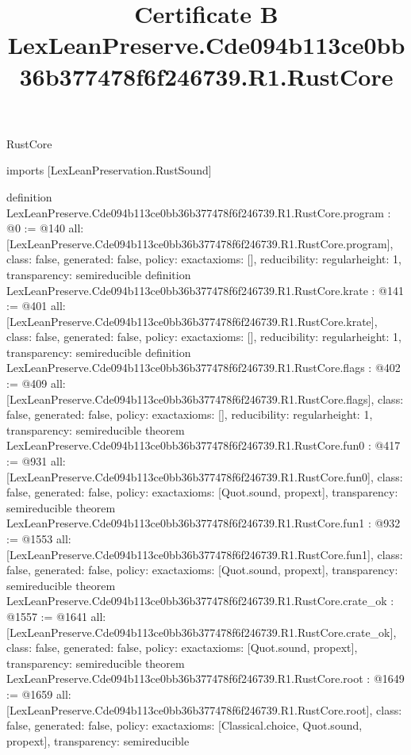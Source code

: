 \begin{lexlean}{RustCore}
\title{Certificate B LexLeanPreserve.Cde094b113ce0bb36b377478f6f246739.R1.RustCore}
\begin{coremodule}
imports [LexLeanPreservation.RustSound]

definition LexLeanPreserve.Cde094b113ce0bb36b377478f6f246739.R1.RustCore.program : @0 := @140 {
  all: [LexLeanPreserve.Cde094b113ce0bb36b377478f6f246739.R1.RustCore.program],
  class: false,
  generated: false,
  policy: exact{axioms: []},
  reducibility: regular{height: 1},
  transparency: semireducible
}
definition LexLeanPreserve.Cde094b113ce0bb36b377478f6f246739.R1.RustCore.krate : @141 := @401 {
  all: [LexLeanPreserve.Cde094b113ce0bb36b377478f6f246739.R1.RustCore.krate],
  class: false,
  generated: false,
  policy: exact{axioms: []},
  reducibility: regular{height: 1},
  transparency: semireducible
}
definition LexLeanPreserve.Cde094b113ce0bb36b377478f6f246739.R1.RustCore.flags : @402 := @409 {
  all: [LexLeanPreserve.Cde094b113ce0bb36b377478f6f246739.R1.RustCore.flags],
  class: false,
  generated: false,
  policy: exact{axioms: []},
  reducibility: regular{height: 1},
  transparency: semireducible
}
theorem LexLeanPreserve.Cde094b113ce0bb36b377478f6f246739.R1.RustCore.fun0 : @417 := @931 {
  all: [LexLeanPreserve.Cde094b113ce0bb36b377478f6f246739.R1.RustCore.fun0],
  class: false,
  generated: false,
  policy: exact{axioms: [Quot.sound, propext]},
  transparency: semireducible
}
theorem LexLeanPreserve.Cde094b113ce0bb36b377478f6f246739.R1.RustCore.fun1 : @932 := @1553 {
  all: [LexLeanPreserve.Cde094b113ce0bb36b377478f6f246739.R1.RustCore.fun1],
  class: false,
  generated: false,
  policy: exact{axioms: [Quot.sound, propext]},
  transparency: semireducible
}
theorem LexLeanPreserve.Cde094b113ce0bb36b377478f6f246739.R1.RustCore.crate_ok : @1557 := @1641 {
  all: [LexLeanPreserve.Cde094b113ce0bb36b377478f6f246739.R1.RustCore.crate_ok],
  class: false,
  generated: false,
  policy: exact{axioms: [Quot.sound, propext]},
  transparency: semireducible
}
theorem LexLeanPreserve.Cde094b113ce0bb36b377478f6f246739.R1.RustCore.root : @1649 := @1659 {
  all: [LexLeanPreserve.Cde094b113ce0bb36b377478f6f246739.R1.RustCore.root],
  class: false,
  generated: false,
  policy: exact{axioms: [Classical.choice, Quot.sound, propext]},
  transparency: semireducible
}


\end{coremodule}
\end{lexlean}
